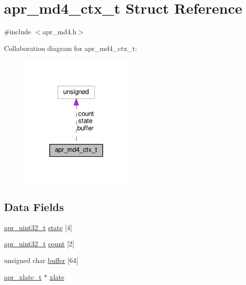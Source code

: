 \hypertarget{structapr__md4__ctx__t}{}\section{apr\+\_\+md4\+\_\+ctx\+\_\+t Struct Reference}
\label{structapr__md4__ctx__t}


{\ttfamily \#include $<$apr\+\_\+md4.\+h$>$}



Collaboration diagram for apr\+\_\+md4\+\_\+ctx\+\_\+t\+:
\nopagebreak
\begin{figure}[H]
\begin{center}
\leavevmode
\includegraphics[width=161pt]{structapr__md4__ctx__t__coll__graph}
\end{center}
\end{figure}
\subsection*{Data Fields}
\begin{DoxyCompactItemize}
\item 
\hyperlink{group__apr__platform_ga558548a135d8a816c4787250744ea147}{apr\+\_\+uint32\+\_\+t} \hyperlink{structapr__md4__ctx__t_a7fc20af590cdf6d01208a12ac0bbc5de}{state} \mbox{[}4\mbox{]}
\item 
\hyperlink{group__apr__platform_ga558548a135d8a816c4787250744ea147}{apr\+\_\+uint32\+\_\+t} \hyperlink{structapr__md4__ctx__t_a0332072316c6a931b6fb1bd8729e3495}{count} \mbox{[}2\mbox{]}
\item 
unsigned char \hyperlink{structapr__md4__ctx__t_a60ce2de9e1c0b8888d81da03afdbfcdb}{buffer} \mbox{[}64\mbox{]}
\item 
\hyperlink{group__APR__XLATE_ga069dabbadc30e3a4157c38104a250e77}{apr\+\_\+xlate\+\_\+t} $\ast$ \hyperlink{structapr__md4__ctx__t_ae4dd6785ef4bf0e04b37d566af786554}{xlate}
\end{DoxyCompactItemize}


